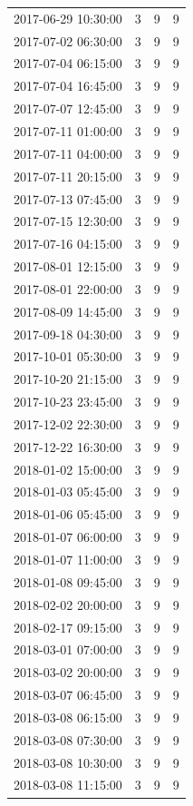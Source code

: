 \begin{tabular}{lrrr}
2017-06-29 10:30:00 & 3 & 9 & 9 \\
2017-07-02 06:30:00 & 3 & 9 & 9 \\
2017-07-04 06:15:00 & 3 & 9 & 9 \\
2017-07-04 16:45:00 & 3 & 9 & 9 \\
2017-07-07 12:45:00 & 3 & 9 & 9 \\
2017-07-11 01:00:00 & 3 & 9 & 9 \\
2017-07-11 04:00:00 & 3 & 9 & 9 \\
2017-07-11 20:15:00 & 3 & 9 & 9 \\
2017-07-13 07:45:00 & 3 & 9 & 9 \\
2017-07-15 12:30:00 & 3 & 9 & 9 \\
2017-07-16 04:15:00 & 3 & 9 & 9 \\
2017-08-01 12:15:00 & 3 & 9 & 9 \\
2017-08-01 22:00:00 & 3 & 9 & 9 \\
2017-08-09 14:45:00 & 3 & 9 & 9 \\
2017-09-18 04:30:00 & 3 & 9 & 9 \\
2017-10-01 05:30:00 & 3 & 9 & 9 \\
2017-10-20 21:15:00 & 3 & 9 & 9 \\
2017-10-23 23:45:00 & 3 & 9 & 9 \\
2017-12-02 22:30:00 & 3 & 9 & 9 \\
2017-12-22 16:30:00 & 3 & 9 & 9 \\
2018-01-02 15:00:00 & 3 & 9 & 9 \\
2018-01-03 05:45:00 & 3 & 9 & 9 \\
2018-01-06 05:45:00 & 3 & 9 & 9 \\
2018-01-07 06:00:00 & 3 & 9 & 9 \\
2018-01-07 11:00:00 & 3 & 9 & 9 \\
2018-01-08 09:45:00 & 3 & 9 & 9 \\
2018-02-02 20:00:00 & 3 & 9 & 9 \\
2018-02-17 09:15:00 & 3 & 9 & 9 \\
2018-03-01 07:00:00 & 3 & 9 & 9 \\
2018-03-02 20:00:00 & 3 & 9 & 9 \\
2018-03-07 06:45:00 & 3 & 9 & 9 \\
2018-03-08 06:15:00 & 3 & 9 & 9 \\
2018-03-08 07:30:00 & 3 & 9 & 9 \\
2018-03-08 10:30:00 & 3 & 9 & 9 \\
2018-03-08 11:15:00 & 3 & 9 & 9 \\

\end{tabular}
